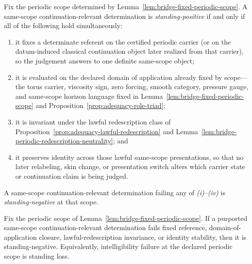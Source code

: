 \begin{manualdefinition}
\label{def:st1-standing-positive-determination}
Fix the periodic scope determined by Lemma~\ref{lem:bridge-fixed-periodic-scope}. A same-scope continuation-relevant determination is \emph{standing-positive} if and only if all of the following hold simultaneously:
\begin{enumerate}[label=(\roman*), leftmargin=2.2em]
\item it fixes a determinate referent on the certified periodic carrier (or on the datum-induced classical continuation object later realized from that carrier), so the judgement answers to one definite same-scope object;
\item it is evaluated on the declared domain of application already fixed by scope---the torus carrier, viscosity sign, zero forcing, smooth category, pressure gauge, and same-scope horizon language fixed in Lemma~\ref{lem:bridge-fixed-periodic-scope} and Proposition~\ref{prop:adequacy-role-triad};
\item it is invariant under the lawful redescription class of Proposition~\ref{prop:adequacy-lawful-redescription} and Lemma~\ref{lem:bridge-periodic-redescription-neutrality}; and
\item it preserves identity across those lawful same-scope presentations, so that no later relabeling, skin change, or presentation switch alters which carrier state or continuation claim is being judged.
\end{enumerate}
A same-scope continuation-relevant determination failing any of \emph{(i)}--\emph{(iv)} is \emph{standing-negative} at that scope.
\end{manualdefinition}

\begin{manualtheorem}
\label{thm:st2-intelligibility-standing-loss}
Fix the periodic scope of Lemma~\ref{lem:bridge-fixed-periodic-scope}. If a purported same-scope continuation-relevant determination fails fixed reference, domain-of-application closure, lawful-redescription invariance, or identity stability, then it is standing-negative. Equivalently, intelligibility failure at the declared periodic scope is standing loss.
\end{manualtheorem}

